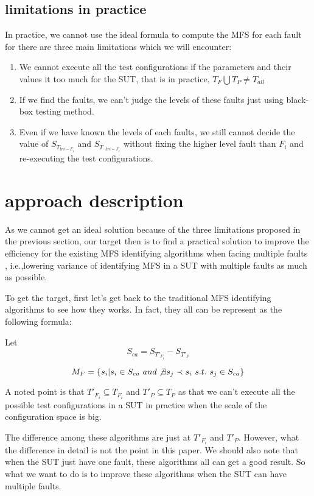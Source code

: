 \documentclass{sig-alternate}
\begin{document}
\subsection{limitations in practice}
In practice, we cannot use the ideal formula to compute the MFS for each fault for there are three main limitations which we will encounter:

\begin{enumerate}
 \item We cannot execute all the test configurations if the parameters and their values it too much for the SUT, that is in practice, $T_{F}\bigcup T_{P} \neq T_{all}$

 \item If we find the faults, we can't judge the levels of these faults just using black-box testing method.

 \item Even if we have known the levels of each faults, we still cannot decide the value of $S_{T_{tri-F_{i}}}$ and  $S_{T_{\neg tri-F_{i}}}$ without fixing the higher level fault than $F_{i}$ and re-executing the test configurations.
\end{enumerate}


\section{approach description}

As we cannot get an ideal solution because of the three limitations proposed in the previous section, our target then is to find a practical solution to improve the efficiency for the existing MFS identifying algorithms when facing multiple faults , i.e.,lowering variance of identifying  MFS in a SUT with multiple faults as much as possible.

To get the target, first let's get back to the traditional MFS identifying algorithms to see how they works. In fact, they all can be represent as the following formula:

Let $$S_{ca} = S_{T'_{F_{i}}} - S_{T'_{P}}$$

$$M_{F} = \{s_{i} | s_{i} \in S_{ca}\ and \not\exists s_{j} \prec s_{i}\ s.t.\ s_{j} \in S_{ca} \}$$

A noted point is that  $ T'_{F_{i}} \subseteq T_{F_{i}} $ and $ T'_{P} \subseteq T_{P} $ as that we can't execute all the possible test configurations in a SUT in practice when the scale of the configuration space is big.

The difference among these algorithms are just at $T'_{F_{i}}$ and  $T'_{P}$. However, what the difference in detail is not the point in this paper. We should also note that when the SUT just have one fault, these algorithms all can get a good result. So what we want to do is to improve these algorithms when the SUT can have multiple faults.
\end{document}
